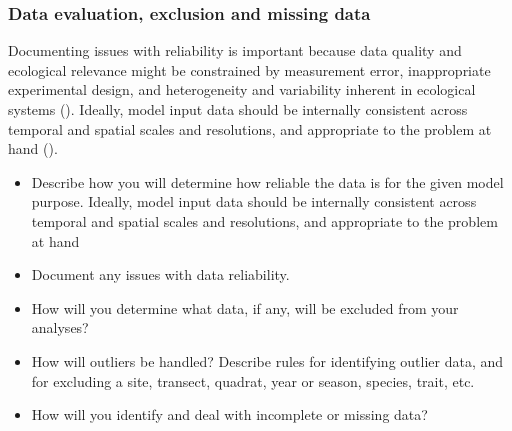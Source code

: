 \documentclass[
]{article}
\providecommand{\tightlist}{%
  \setlength{\itemsep}{0pt}\setlength{\parskip}{0pt}}
\begin{document}
\subsubsection{Data evaluation, exclusion and missing
data}\label{data-evaluation-exclusion-and-missing-data}

\begin{tcolorbox}[enhanced jigsaw, opacitybacktitle=0.6, bottomrule=.15mm, leftrule=.75mm, rightrule=.15mm, colbacktitle=quarto-callout-note-color!10!white, toprule=.15mm, titlerule=0mm, left=2mm, colframe=quarto-callout-note-color-frame, breakable, title=\textcolor{quarto-callout-note-color}{\faInfo}\hspace{0.5em}{Explanation}, opacityback=0, coltitle=black, bottomtitle=1mm, colback=white, toptitle=1mm, arc=.35mm]

Documenting issues with reliability is important because data quality
and ecological relevance might be constrained by measurement error,
inappropriate experimental design, and heterogeneity and variability
inherent in ecological systems (). Ideally, model input data should be internally consistent
across temporal and spatial scales and resolutions, and appropriate to
the problem at hand ().

\end{tcolorbox}

\begin{tcolorbox}[enhanced jigsaw, opacitybacktitle=0.6, bottomrule=.15mm, leftrule=.75mm, rightrule=.15mm, colbacktitle=quarto-callout-caution-color!10!white, toprule=.15mm, titlerule=0mm, left=2mm, colframe=quarto-callout-caution-color-frame, breakable, title=\textcolor{quarto-callout-caution-color}{\faFire}\hspace{0.5em}{Preregistration Item}, opacityback=0, coltitle=black, bottomtitle=1mm, colback=white, toptitle=1mm, arc=.35mm]

\begin{itemize}
\tightlist
\item[$\square$]
  Describe how you will determine how reliable the data is for the given
  model purpose. Ideally, model input data should be internally
  consistent across temporal and spatial scales and resolutions, and
  appropriate to the problem at hand
\item[$\square$]
  Document any issues with data reliability.
\item[$\square$]
  How will you determine what data, if any, will be excluded from your
  analyses?
\item[$\square$]
  How will outliers be handled? Describe rules for identifying outlier
  data, and for excluding a site, transect, quadrat, year or season,
  species, trait, etc.
\item[$\square$]
  How will you identify and deal with incomplete or missing data?
\end{itemize}

\end{tcolorbox}
\end{document}
